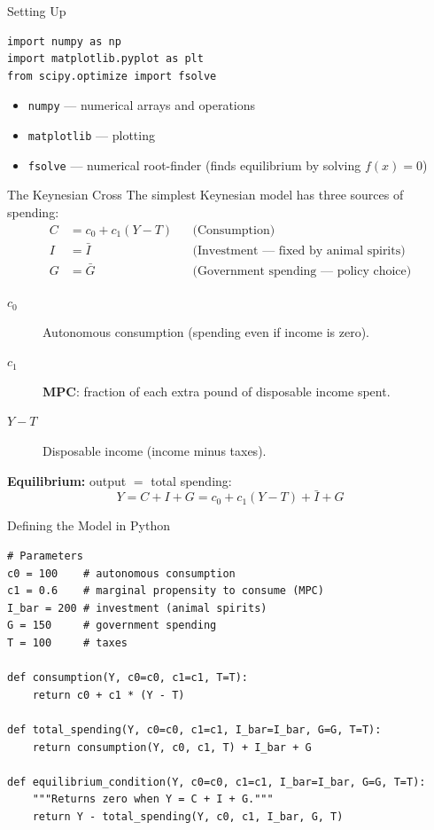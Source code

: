 \documentclass[aspectratio=169, 10pt]{beamer}
\begin{document}
\begin{frame}[fragile]{Setting Up}
\begin{lstlisting}
import numpy as np
import matplotlib.pyplot as plt
from scipy.optimize import fsolve
\end{lstlisting}
\vspace{0.5em}
\begin{itemize}
  \item \texttt{numpy} --- numerical arrays and operations
  \item \texttt{matplotlib} --- plotting
  \item \texttt{fsolve} --- numerical root-finder
        (finds equilibrium by solving $f(x) = 0$)
\end{itemize}
\end{frame}

\begin{frame}{The Keynesian Cross}
The simplest Keynesian model has three sources of spending:
\vspace{0.3em}
\begin{align*}
  C &= c_0 + c_1(Y - T) & &\text{(Consumption)} \\[2pt]
  I &= \bar{I}           & &\text{(Investment --- fixed by animal spirits)} \\[2pt]
  G &= \bar{G}           & &\text{(Government spending --- policy choice)}
\end{align*}
\vspace{0.2em}
\begin{description}
  \item[$c_0$] Autonomous consumption (spending even if income is zero).
  \item[$c_1$] \textbf{MPC}: fraction of each extra pound of disposable income spent.
  \item[$Y - T$] Disposable income (income minus taxes).
\end{description}
\vspace{0.3em}
\textbf{Equilibrium:} output $=$ total spending:
\[
  Y = C + I + G = c_0 + c_1(Y - T) + \bar{I} + G
\]
\end{frame}

\begin{frame}[fragile]{Defining the Model in Python}
\begin{lstlisting}
# Parameters
c0 = 100    # autonomous consumption
c1 = 0.6    # marginal propensity to consume (MPC)
I_bar = 200 # investment (animal spirits)
G = 150     # government spending
T = 100     # taxes

def consumption(Y, c0=c0, c1=c1, T=T):
    return c0 + c1 * (Y - T)

def total_spending(Y, c0=c0, c1=c1, I_bar=I_bar, G=G, T=T):
    return consumption(Y, c0, c1, T) + I_bar + G

def equilibrium_condition(Y, c0=c0, c1=c1, I_bar=I_bar, G=G, T=T):
    """Returns zero when Y = C + I + G."""
    return Y - total_spending(Y, c0, c1, I_bar, G, T)
\end{lstlisting}
\end{frame}
\end{document}
